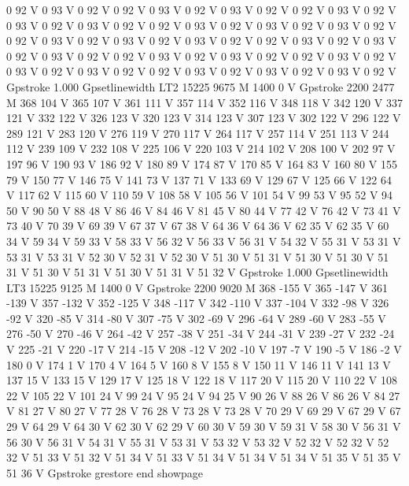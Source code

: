 0 92 V
0 93 V
0 92 V
0 92 V
0 93 V
0 92 V
0 93 V
0 92 V
0 92 V
0 93 V
0 92 V
0 93 V
0 92 V
0 93 V
0 92 V
0 92 V
0 93 V
0 92 V
0 93 V
0 92 V
0 93 V
0 92 V
0 92 V
0 93 V
0 92 V
0 93 V
0 92 V
0 93 V
0 92 V
0 92 V
0 93 V
0 92 V
0 93 V
0 92 V
0 93 V
0 92 V
0 92 V
0 93 V
0 92 V
0 93 V
0 92 V
0 92 V
0 93 V
0 92 V
0 93 V
0 92 V
0 93 V
0 92 V
0 92 V
0 93 V
0 92 V
0 93 V
0 92 V
0 93 V
0 92 V
Gpstroke
1.000 Gpsetlinewidth
LT2
15225 9675 M
1400 0 V
Gpstroke
2200 2477 M
368 104 V
365 107 V
361 111 V
357 114 V
352 116 V
348 118 V
342 120 V
337 121 V
332 122 V
326 123 V
320 123 V
314 123 V
307 123 V
302 122 V
296 122 V
289 121 V
283 120 V
276 119 V
270 117 V
264 117 V
257 114 V
251 113 V
244 112 V
239 109 V
232 108 V
225 106 V
220 103 V
214 102 V
208 100 V
202 97 V
197 96 V
190 93 V
186 92 V
180 89 V
174 87 V
170 85 V
164 83 V
160 80 V
155 79 V
150 77 V
146 75 V
141 73 V
137 71 V
133 69 V
129 67 V
125 66 V
122 64 V
117 62 V
115 60 V
110 59 V
108 58 V
105 56 V
101 54 V
99 53 V
95 52 V
94 50 V
90 50 V
88 48 V
86 46 V
84 46 V
81 45 V
80 44 V
77 42 V
76 42 V
73 41 V
73 40 V
70 39 V
69 39 V
67 37 V
67 38 V
64 36 V
64 36 V
62 35 V
62 35 V
60 34 V
59 34 V
59 33 V
58 33 V
56 32 V
56 33 V
56 31 V
54 32 V
55 31 V
53 31 V
53 31 V
53 31 V
52 30 V
52 31 V
52 30 V
51 30 V
51 31 V
51 30 V
51 30 V
51 31 V
51 30 V
51 31 V
51 30 V
51 31 V
51 32 V
Gpstroke
1.000 Gpsetlinewidth
LT3
15225 9125 M
1400 0 V
Gpstroke
2200 9020 M
368 -155 V
365 -147 V
361 -139 V
357 -132 V
352 -125 V
348 -117 V
342 -110 V
337 -104 V
332 -98 V
326 -92 V
320 -85 V
314 -80 V
307 -75 V
302 -69 V
296 -64 V
289 -60 V
283 -55 V
276 -50 V
270 -46 V
264 -42 V
257 -38 V
251 -34 V
244 -31 V
239 -27 V
232 -24 V
225 -21 V
220 -17 V
214 -15 V
208 -12 V
202 -10 V
197 -7 V
190 -5 V
186 -2 V
180 0 V
174 1 V
170 4 V
164 5 V
160 8 V
155 8 V
150 11 V
146 11 V
141 13 V
137 15 V
133 15 V
129 17 V
125 18 V
122 18 V
117 20 V
115 20 V
110 22 V
108 22 V
105 22 V
101 24 V
99 24 V
95 24 V
94 25 V
90 26 V
88 26 V
86 26 V
84 27 V
81 27 V
80 27 V
77 28 V
76 28 V
73 28 V
73 28 V
70 29 V
69 29 V
67 29 V
67 29 V
64 29 V
64 30 V
62 30 V
62 29 V
60 30 V
59 30 V
59 31 V
58 30 V
56 31 V
56 30 V
56 31 V
54 31 V
55 31 V
53 31 V
53 32 V
53 32 V
52 32 V
52 32 V
52 32 V
51 33 V
51 32 V
51 34 V
51 33 V
51 34 V
51 34 V
51 34 V
51 35 V
51 35 V
51 36 V
Gpstroke
grestore
end
showpage
